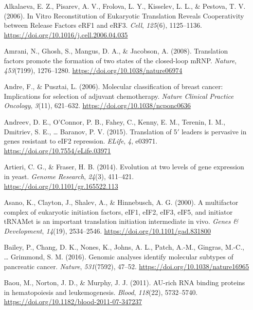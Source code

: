 \documentclass[12pt,openany]{book}
\begin{document}
\hypertarget{ref-Alkalaeva2006}{}
Alkalaeva, E. Z., Pisarev, A. V., Frolova, L. Y., Kisselev, L. L., \&
Pestova, T. V. (2006). In Vitro Reconstitution of Eukaryotic Translation
Reveals Cooperativity between Release Factors eRF1 and eRF3.
\emph{Cell}, \emph{125}(6), 1125--1136.
\url{https://doi.org/10.1016/j.cell.2006.04.035}

\hypertarget{ref-Amrani2008}{}
Amrani, N., Ghosh, S., Mangus, D. A., \& Jacobson, A. (2008).
Translation factors promote the formation of two states of the
closed-loop mRNP. \emph{Nature}, \emph{453}(7199), 1276--1280.
\url{https://doi.org/10.1038/nature06974}

\hypertarget{ref-Andre2006}{}
Andre, F., \& Pusztai, L. (2006). Molecular classification of breast
cancer: Implications for selection of adjuvant chemotherapy.
\emph{Nature Clinical Practice Oncology}, \emph{3}(11), 621--632.
\url{https://doi.org/10.1038/ncponc0636}

\hypertarget{ref-Andreev2015}{}
Andreev, D. E., O'Connor, P. B., Fahey, C., Kenny, E. M., Terenin, I.
M., Dmitriev, S. E., \ldots{} Baranov, P. V. (2015). Translation of
5\({'}\) leaders is pervasive in genes resistant to eIF2 repression.
\emph{ELife}, \emph{4}, e03971.
\url{https://doi.org/10.7554/eLife.03971}

\hypertarget{ref-Artieri2014}{}
Artieri, C. G., \& Fraser, H. B. (2014). Evolution at two levels of gene
expression in yeast. \emph{Genome Research}, \emph{24}(3), 411--421.
\url{https://doi.org/10.1101/gr.165522.113}

\hypertarget{ref-Asano2000}{}
Asano, K., Clayton, J., Shalev, A., \& Hinnebusch, A. G. (2000). A
multifactor complex of eukaryotic initiation factors, eIF1, eIF2, eIF3,
eIF5, and initiator tRNAMet is an important translation initiation
intermediate in vivo. \emph{Genes \& Development}, \emph{14}(19),
2534--2546. \url{https://doi.org/10.1101/gad.831800}

\hypertarget{ref-Bailey2016}{}
Bailey, P., Chang, D. K., Nones, K., Johns, A. L., Patch, A.-M.,
Gingras, M.-C., \ldots{} Grimmond, S. M. (2016). Genomic analyses
identify molecular subtypes of pancreatic cancer. \emph{Nature},
\emph{531}(7592), 47--52. \url{https://doi.org/10.1038/nature16965}

\hypertarget{ref-Baou2011}{}
Baou, M., Norton, J. D., \& Murphy, J. J. (2011). AU-rich RNA binding
proteins in hematopoiesis and leukemogenesis. \emph{Blood},
\emph{118}(22), 5732--5740.
\url{https://doi.org/10.1182/blood-2011-07-347237}
\end{document}
